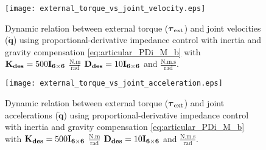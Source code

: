 \begin{figure}
\centering
\texttt{[image: external\_torque\_vs\_joint\_velocity.eps]}
\caption{Dynamic relation between external torque ($\boldsymbol{\tau}_\mathrm{ext}$) and joint velocities ($\mathbf{\dot{q}}$) using proportional-derivative impedance control with inertia and gravity compensation \eqref{eq:articular_PDi_M_b} with $\mathbf{K_{des}}=500\mathbf{I_{6 \times 6}}$ $\mathrm{\frac{N.m}{rad}}$ $\mathbf{D_{des}}=10\mathbf{I_{6 \times 6}}$ and $\mathrm{\frac{N.m.s}{rad}}$.}
\label{fig:act1.3_tau_vs_dq}
\end{figure}

\begin{figure}
\centering
\texttt{[image: external\_torque\_vs\_joint\_acceleration.eps]}
\caption{Dynamic relation between external torque ($\boldsymbol{\tau}_\mathrm{ext}$) and joint accelerations ($\mathbf{\ddot{q}}$) using proportional-derivative impedance control with inertia and gravity compensation \eqref{eq:articular_PDi_M_b} with $\mathbf{K_{des}}=500\mathbf{I_{6 \times 6}}$ $\mathrm{\frac{N.m}{rad}}$ $\mathbf{D_{des}}=10\mathbf{I_{6 \times 6}}$ and $\mathrm{\frac{N.m.s}{rad}}$.}
\label{fig:act1.3_tau_vs_ddq}
\end{figure}

